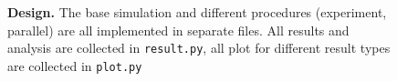 \documentclass[10pt]{article}
\begin{document}

\begin{figure}[ht]
	\vspace*{-2cm}
	\caption{\textbf{Design.} The base simulation and different procedures (experiment, parallel) are all implemented in separate files. All results and analysis are collected in \texttt{result.py}, all plot for different result types are collected in \texttt{plot.py}}
\label{fig:code}
\end{figure}


\clearpage
{}
\printbibliography
\end{document}
